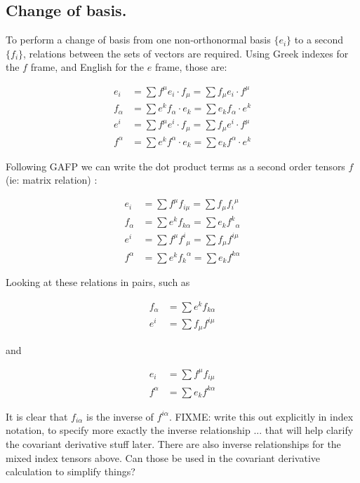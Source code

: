 \documentclass{article}      %
\begin{document}
\subsection{ Change of basis. }

To perform a change of basis from one non-orthonormal basis $\{e_i\}$ to a second $\{f_i\}$, relations between the sets of vectors
are required.  Using Greek indexes for the $f$ frame, and English for the $e$ frame, those are:

\begin{align*}
e_i 		&= \sum f^{\mu} e_i \cdot f_{\mu} 	= \sum f_{\mu} e_i \cdot f^{\mu} \\
f_{\alpha} 	&= \sum e^k f_{\alpha} \cdot e_k 	= \sum e_k f_{\alpha} \cdot e^k \\
e^i 		&= \sum f^{\mu} e^i \cdot f_{\mu} 	= \sum f_{\mu} e^i \cdot f^{\mu} \\
f^{\alpha} 	&= \sum e^k f^{\alpha} \cdot e_k 	= \sum e_k f^{\alpha} \cdot e^k 
\end{align*}

Following GAFP we can write the dot product terms as a second order tensors $f$ (ie: matrix relation) :

\begin{align*}
e_i 		&= \sum f^{\mu} f_{i\mu}  	= \sum f_{\mu} {f_i}^{\mu} \\
f_{\alpha} 	&= \sum e^k f_{k\alpha} 	= \sum e_k {f^k}_{\alpha} \\
e^i 		&= \sum f^{\mu} {f^i}_{\mu} 	= \sum f_{\mu} f^{i \mu} \\
f^{\alpha} 	&= \sum e^k {f_k}^{\alpha}  	= \sum e_k f^{k\alpha}
\end{align*}

Looking at these relations in pairs, such as

\begin{align*}
f_{\alpha} 	&= \sum e^k f_{k\alpha} \\ 
e^i 		&= \sum f_{\mu} f^{i \mu} 
\end{align*}

and 

\begin{align*}
e_i 		&= \sum f^{\mu} f_{i\mu} \\
f^{\alpha} 	&= \sum e_k f^{k\alpha}
\end{align*}

It is clear that $f_{i\alpha}$ is the inverse of $f^{i\alpha}$.  FIXME: write this out explicitly in index notation, to specify
more exactly the inverse relationship ... that will help clarify the covariant derivative stuff later.  There are also inverse relationships for the mixed index tensors above.  Can those be used in the covariant derivative calculation to simplify things?
\end{document}
